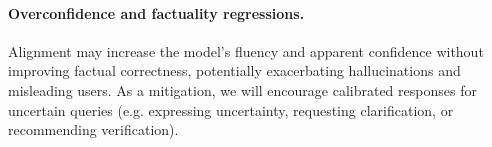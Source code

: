 \documentclass[11pt]{article}
\begin{document}
\paragraph{Overconfidence and factuality regressions.}
Alignment may increase the model's fluency and apparent confidence without improving factual correctness, potentially exacerbating hallucinations and misleading users. As a mitigation, we will encourage calibrated responses for uncertain queries (e.g. expressing uncertainty, requesting clarification, or recommending verification).
\end{document}
